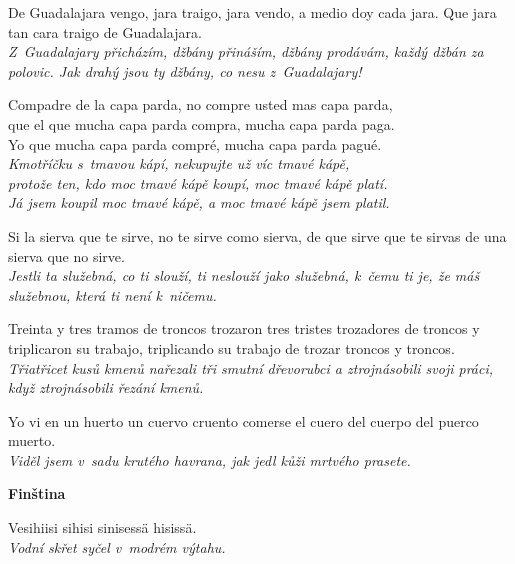\medskip

\noindent
De Guadalajara vengo, jara traigo, jara vendo, a medio doy cada jara.  Que jara tan cara traigo de Guadalajara. \\
\textit{Z~Guadalajary přicházím, džbány přináším, džbány prodávám, každý džbán za polovic.  Jak drahý jsou ty džbány, co nesu z~Guadalajary!}

\medskip

\noindent
Compadre de la capa parda, no compre usted mas capa parda, \\
que el que mucha capa parda compra, mucha capa parda paga. \\
Yo que mucha capa parda compré, mucha capa parda pagué. \\
\textit{Kmotříčku s~tmavou kápí, nekupujte už víc tmavé kápě, \\ protože ten, kdo moc tmavé kápě koupí, moc tmavé kápě platí. \\ Já jsem koupil moc tmavé kápě, a moc tmavé kápě jsem platil.}

\medskip

\noindent
Si la sierva que te sirve, no te sirve como sierva, de que sirve que te sirvas de una sierva que no sirve. \\
\textit{Jestli ta služebná, co ti slouží, ti neslouží jako služebná, k~čemu ti je, že máš služebnou, která ti není k~ničemu.}

\medskip

\noindent
Treinta y tres tramos de troncos trozaron tres tristes trozadores de troncos y triplicaron su trabajo, triplicando su trabajo de trozar troncos y troncos.  \\
\textit{Třiatřicet kusů kmenů nařezali tři smutní dřevorubci a ztrojnásobili svoji práci, když ztrojnásobili řezání kmenů.}

\medskip

\noindent
Yo vi en un huerto un cuervo cruento comerse el cuero del cuerpo del puerco muerto.  \\
\textit{Viděl jsem v~sadu krutého havrana, jak jedl kůži mrtvého prasete.}

\medskip


\pagebreak

\noindent
\textbf{Finština}

\medskip

\noindent
Vesihiisi sihisi sinisessä hisissä. \\
\textit{Vodní skřet syčel v modrém výtahu.}

